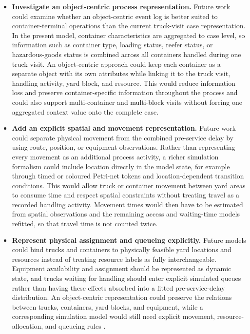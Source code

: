 \begin{itemize}
    \item \textbf{Investigate an object-centric process representation.}
    Future work could examine whether an object-centric event log is better
    suited to container-terminal operations than the current truck-visit case
    representation. In the present model, container characteristics are
    aggregated to case level, so information such as container type, loading
    status, reefer status, or hazardous-goods status is combined across all
    containers handled during one truck visit. An object-centric approach could
    keep each container as a separate object with its own attributes while
    linking it to the truck visit, handling activity, yard block, and resource.
    This would reduce information loss and preserve container-specific information throughout the process
    and could also support multi-container and multi-block visits without
    forcing one aggregated context value onto the complete case.

    \item \textbf{Add an explicit spatial and movement representation.}
    Future work could separate physical movement from the combined
    pre-service delay by using route, position, or equipment observations.
    Rather than representing every movement as an additional process activity,
    a richer simulation formalism could include location directly in the model
    state, for example through timed or coloured Petri-net tokens and
    location-dependent transition conditions. This would allow truck or
    container movement between yard areas to consume time and respect spatial
    constraints without treating travel as a recorded handling activity.
    Movement times would then have to be estimated from spatial observations
    and the remaining access and waiting-time models refitted, so that travel
    time is not counted twice.

   \item \textbf{Represent physical assignment and queueing explicitly.}
    Future models could bind trucks and containers to physically feasible
    yard locations and resources instead of treating resource labels as fully
    interchangeable. Equipment availability and assignment should be represented
    as dynamic state, and trucks waiting for handling should enter explicit
    simulated queues rather than having these effects absorbed into a fitted
    pre-service-delay distribution. An object-centric representation could
    preserve the relations between trucks, containers, yard blocks, and
    equipment, while a corresponding simulation model would still need explicit
    movement, resource-allocation, and queueing rules
    \cite{VanDerAalst2023OCPM,Knopp2023ObjectCentricSimulation}.

    
    
\end{itemize}
